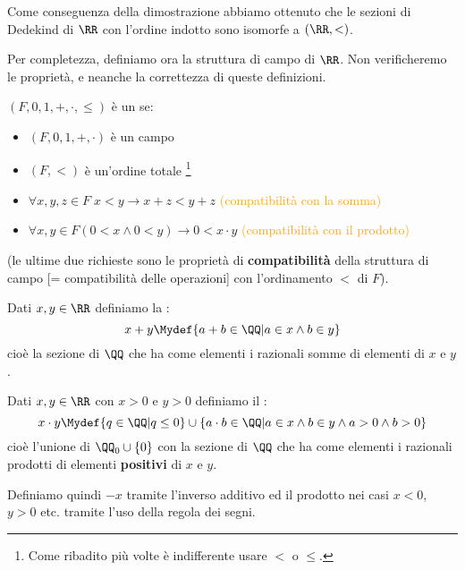\documentclass[11pt]{scrartcl}
\begin{document}
\begin{note}
	Come conseguenza della dimostrazione abbiamo ottenuto che le sezioni di Dedekind di $\RR$ con l'ordine indotto sono isomorfe a $(\RR,<)$.
\end{note}

Per completezza, definiamo ora la struttura di campo di $\RR$. Non verificheremo le proprietà, e neanche la correttezza di queste definizioni.

\begin{definition}
	$(F,0,1,+,\cdot,\leq)$ è un  se:
	\begin{itemize}
		\item $(F,0,1,+,\cdot)$ è un campo
		\item $(F,<)$ è un'ordine totale \footnote{Come ribadito più volte è indifferente usare $<$ o $\leq$.}
		\item $\forall x,y,z \in F \; x < y \rightarrow x + z < y + z$ \textcolor{orange}{(compatibilità con la somma)}
		\item $\forall x,y \in F (0 < x \land 0 < y) \rightarrow 0 < x \cdot y$ \textcolor{orange}{(compatibilità con il prodotto)}
	\end{itemize}
	(le ultime due richieste sono le proprietà di \textbf{compatibilità} della struttura di campo [= compatibilità delle operazioni] con l'ordinamento $<$ di $F$).
\end{definition}

\begin{definition}[Somma su $\RR$]
	Dati $x,y \in \RR$ definiamo la :
	\[ x + y \Mydef \{a + b \in \QQ | a \in x \land b \in y\}
		\]
	cioè la sezione di $\QQ$ che ha come elementi i razionali somme di elementi di $x$ e $y$.
\end{definition}

\begin{definition}[Prodotto su $\RR$]
	Dati $x,y \in \RR$ con $x > 0$ e $y > 0$ definiamo il :
	\[ x \cdot y \Mydef \{q \in \QQ | q \leq 0\} \cup \{a\cdot b \in \QQ| a \in x  \land b \in y \land a > 0 \land b > 0\}
		\]
	cioè l'unione di $\QQ_0 \cup \{0\}$ con la sezione di $\QQ$ che ha come elementi i razionali prodotti di elementi \textbf{positivi} di $x$ e $y$.
\end{definition}

Definiamo quindi $-x$ tramite l'inverso additivo ed il prodotto nei casi $x < 0$, $y>0$ etc. tramite l'uso della regola dei segni.
\end{document}
